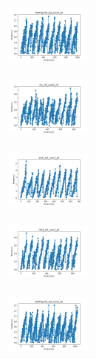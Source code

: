 \begin{figure}[H]
\begin{subfigure}
    \end{subfigure}
    \hfill
    \begin{subfigure}
        \centering
        \includegraphics[width=0.234\textwidth]{img/bmb/newthyroid_set_const_20_277451237_time.png}
    \end{subfigure}
    \hfill
    \begin{subfigure}
        \centering
        \includegraphics[width=0.234\textwidth]{img/bmb/iris_set_const_20_49258669_time.png}
    \end{subfigure}
    \hfill
    \begin{subfigure}
        \centering
        \includegraphics[width=0.234\textwidth]{img/bmb/ecoli_set_const_20_49258669_time.png}
    \end{subfigure}
    \hfill
    \begin{subfigure}
        \centering
        \includegraphics[width=0.234\textwidth]{img/bmb/rand_set_const_20_49258669_time.png}
    \end{subfigure}
    \hfill
    \begin{subfigure}
        \centering
        \includegraphics[width=0.234\textwidth]{img/bmb/newthyroid_set_const_20_49258669_time.png}
    \end{subfigure}
    \hfill
    \begin{subfigure}

\end{subfigure}
\end{figure}
